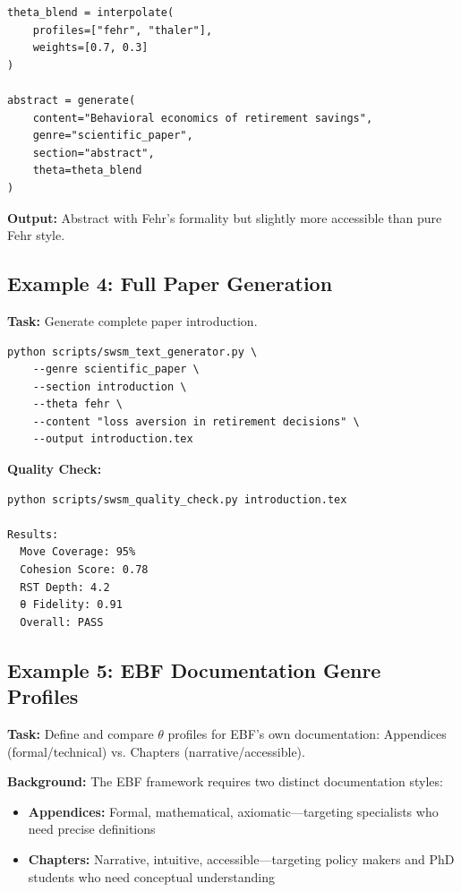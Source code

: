 \begin{verbatim}
theta_blend = interpolate(
    profiles=["fehr", "thaler"],
    weights=[0.7, 0.3]
)

abstract = generate(
    content="Behavioral economics of retirement savings",
    genre="scientific_paper",
    section="abstract",
    theta=theta_blend
)
\end{verbatim}

\textbf{Output:} Abstract with Fehr's formality but slightly more accessible than pure Fehr style.

\subsection{Example 4: Full Paper Generation}
\label{sec:sw-ex4}

\textbf{Task:} Generate complete paper introduction.

\begin{verbatim}
python scripts/swsm_text_generator.py \
    --genre scientific_paper \
    --section introduction \
    --theta fehr \
    --content "loss aversion in retirement decisions" \
    --output introduction.tex
\end{verbatim}

\textbf{Quality Check:}
\begin{verbatim}
python scripts/swsm_quality_check.py introduction.tex

Results:
  Move Coverage: 95%
  Cohesion Score: 0.78
  RST Depth: 4.2
  θ Fidelity: 0.91
  Overall: PASS
\end{verbatim}


\subsection{Example 5: EBF Documentation Genre Profiles}
\label{sec:sw-ex5}

\textbf{Task:} Define and compare $\theta$ profiles for EBF's own documentation: Appendices (formal/technical) vs. Chapters (narrative/accessible).

\textbf{Background:} The EBF framework requires two distinct documentation styles:
\begin{itemize}
    \item \textbf{Appendices:} Formal, mathematical, axiomatic---targeting specialists who need precise definitions
    \item \textbf{Chapters:} Narrative, intuitive, accessible---targeting policy makers and PhD students who need conceptual understanding
\end{itemize}

